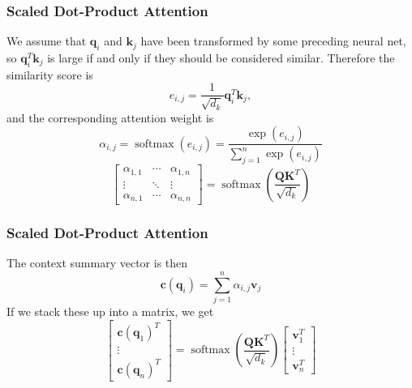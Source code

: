 \documentclass{beamer}
\DeclareMathOperator*{\softmax}{softmax}
\begin{document}
\begin{frame}
  \frametitle{Scaled Dot-Product Attention}

  We assume that $\bm{q}_i$ and $\bm{k}_j$ have been transformed by
  some preceding neural net, so $\bm{q}_i^T\bm{k}_j$ is large if and
  only if they should be considered similar.  Therefore the similarity
  score is
  \begin{displaymath}
    e_{i,j} = \frac{1}{\sqrt{d_k}} \bm{q}_i^T\bm{k}_j,
  \end{displaymath}
  and the corresponding attention weight is
  \begin{displaymath}
    \alpha_{i,j} = \softmax(e_{i,j}) = \frac{\exp(e_{i,j})}{\sum_{j=1}^n \exp(e_{i,j})}
  \end{displaymath}
  \begin{displaymath}
    \left[\begin{array}{ccc}
        \alpha_{1,1}&\cdots&\alpha_{1,n}\\
        \vdots&\ddots&\vdots\\
        \alpha_{n,1}&\cdots&\alpha_{n,n}
      \end{array}\right]
    = \softmax\left(\frac{\bm{Q}\bm{K}^T}{\sqrt{d_k}}\right)
  \end{displaymath}
\end{frame}

\begin{frame}
  \frametitle{Scaled Dot-Product Attention}

  The context summary vector is then
  \begin{displaymath}
    \bm{c}(\bm{q}_i) = \sum_{j=1}^n \alpha_{i,j} \bm{v}_j
  \end{displaymath}
  If we stack these up into a matrix, we get
  \begin{displaymath}
    \left[\begin{array}{c}\bm{c}(\bm{q}_1)^T\\\vdots\\\bm{c}(\bm{q}_n)^T\end{array}\right] =
    \softmax\left(\frac{\bm{Q}\bm{K}^T}{\sqrt{d_k}}\right)
    \left[\begin{array}{c}\bm{v}_1^T\\\vdots\\\bm{v}_n^T\end{array}\right]
  \end{displaymath}
\end{frame}
\end{document}
